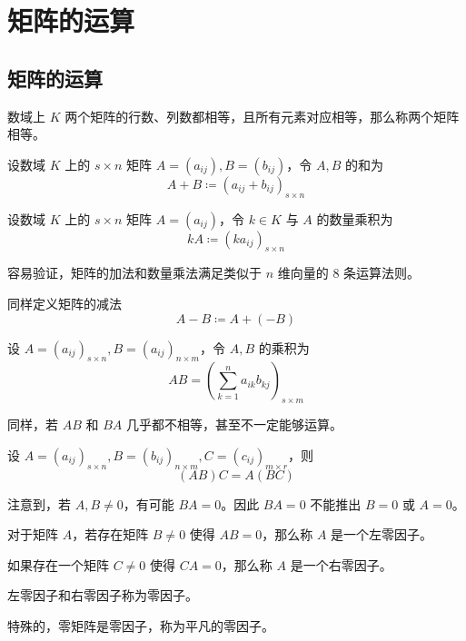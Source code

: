 \chapter{矩阵的运算}

\section{矩阵的运算}

数域上 $K$ 两个矩阵的行数、列数都相等，且所有元素对应相等，那么称两个矩阵相等。

\begin{definition}
    设数域 $K$ 上的 $s\times n$ 矩阵 $A=(a_{ij}),B=(b_{ij})$，令 $A,B$ 的和为
    \[A+B \coloneqq  (a_{ij}+b_{ij})_{s\times n}\]
\end{definition}

\begin{definition}
    设数域 $K$ 上的 $s\times n$ 矩阵 $A=(a_{ij})$，令 $k\in K$ 与 $A$ 的数量乘积为
    \[kA \coloneqq  (ka_{ij})_{s\times n}\]
\end{definition}

容易验证，矩阵的加法和数量乘法满足类似于 $n$ 维向量的 8 条运算法则。

同样定义矩阵的减法
\[A-B \coloneqq  A+(-B)\]

\begin{definition}
    设 $A=(a_{ij})_{s\times n},B=(a_{ij})_{n\times m}$，令 $A,B$ 的乘积为
    \[AB = \left(\sum_{k=1}^na_{ik}b_{kj}\right)_{s\times m}\]
\end{definition}

同样，若 $AB$ 和 $BA$ 几乎都不相等，甚至不一定能够运算。

\begin{theorem}
    设 $A=(a_{ij})_{s\times n},B=(b_{ij})_{n\times m},C=(c_{ij})_{m\times r}$，则
    \[(AB)C = A(BC)\]
\end{theorem}

注意到，若 $A,B\ne 0$，有可能 $BA = 0$。因此 $BA = 0$ 不能推出 $B=0$ 或 $A=0$。

\begin{definition}[零因子]
    对于矩阵 $A$，若存在矩阵 $B\ne 0$ 使得 $AB = 0$，那么称 $A$ 是一个左零因子。
    
    如果存在一个矩阵 $C\ne 0$ 使得 $CA = 0$，那么称 $A$ 是一个右零因子。
    
    左零因子和右零因子称为零因子。 
\end{definition}

特殊的，零矩阵是零因子，称为平凡的零因子。


